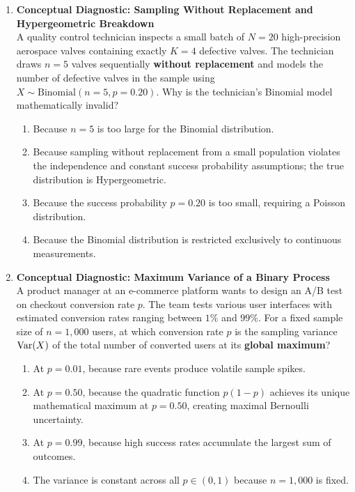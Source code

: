 \begin{enumerate}[resume]
\item \textbf{Conceptual Diagnostic: Sampling Without Replacement and Hypergeometric Breakdown} \\
A quality control technician inspects a small batch of $N = 20$ high-precision aerospace valves containing exactly $K = 4$ defective valves. The technician draws $n = 5$ valves sequentially \textbf{without replacement} and models the number of defective valves in the sample using $X \sim \text{Binomial}(n=5, p=0.20)$. Why is the technician's Binomial model mathematically invalid?
\begin{enumerate}
    \item Because $n = 5$ is too large for the Binomial distribution.
    \item Because sampling without replacement from a small population violates the independence and constant success probability assumptions; the true distribution is Hypergeometric.
    \item Because the success probability $p = 0.20$ is too small, requiring a Poisson distribution.
    \item Because the Binomial distribution is restricted exclusively to continuous measurements.
\end{enumerate}

\item \textbf{Conceptual Diagnostic: Maximum Variance of a Binary Process} \\
A product manager at an e-commerce platform wants to design an A/B test on checkout conversion rate $p$. The team tests various user interfaces with estimated conversion rates ranging between $1\%$ and $99\%$. For a fixed sample size of $n = 1{,}000$ users, at which conversion rate $p$ is the sampling variance $\operatorname{Var}(X)$ of the total number of converted users at its \textbf{global maximum}?
\begin{enumerate}
    \item At $p = 0.01$, because rare events produce volatile sample spikes.
    \item At $p = 0.50$, because the quadratic function $p(1 - p)$ achieves its unique mathematical maximum at $p = 0.50$, creating maximal Bernoulli uncertainty.
    \item At $p = 0.99$, because high success rates accumulate the largest sum of outcomes.
    \item The variance is constant across all $p \in (0, 1)$ because $n = 1{,}000$ is fixed.
\end{enumerate}
\end{enumerate}
